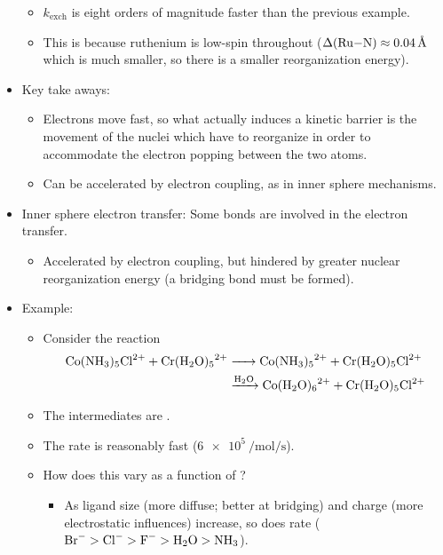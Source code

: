 \documentclass[../notes.tex]{subfiles}
\begin{document}
\begin{itemize}
\begin{itemize}
        \item $k_\text{exch}$ is eight orders of magnitude faster than the previous example.
        \item This is because ruthenium is low-spin throughout ($\Delta(\ce{Ru-N})\approx\SI{0.04}{\angstrom}$ which is much smaller, so there is a smaller reorganization energy).
    \end{itemize}
    \item Key take aways:
    \begin{itemize}
        \item Electrons move fast, so what actually induces a kinetic barrier is the movement of the nuclei which have to reorganize in order to accommodate the electron popping between the two atoms.
        \item Can be accelerated by electron coupling, as in inner sphere mechanisms.
    \end{itemize}
    \item Inner sphere electron transfer: Some bonds are involved in the electron transfer.
    \begin{itemize}
        \item Accelerated by electron coupling, but hindered by greater nuclear reorganization energy (a bridging bond must be formed).
    \end{itemize}
    \item Example:
    \begin{itemize}
        \item Consider the reaction
        \begin{align*}
            \ce{Co(NH3)5Cl^2+ + Cr(H2O)5^2+} &\ce{->} \ce{Co(NH3)5^2+ + Cr(H2O)5Cl^2+}\\
            &\ce{->[H2O]} \ce{Co(H2O)6^2+ + Cr(H2O)5Cl^2+}
        \end{align*}
        \item The intermediates are .
        \item The rate is reasonably fast ($\SI{6e5}{\per\mole\per\second}$).
        \item How does this vary as a function of ?
        \begin{itemize}
            \item As ligand size (more diffuse; better at bridging) and charge (more electrostatic influences) increase, so does rate ($\ce{Br-}>\ce{Cl-}>\ce{F-}>\ce{H2O}>\ce{NH3}$).
        \end{itemize}

\end{itemize}
\end{itemize}
\end{document}
